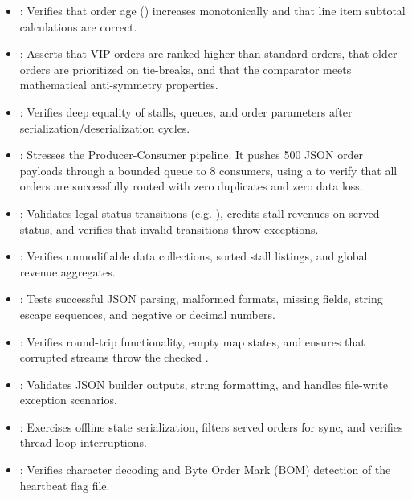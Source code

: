 \begin{itemize}
    \item {}: Verifies that order age () increases monotonically and that line item subtotal calculations are correct.
    \item {}: Asserts that VIP orders are ranked higher than standard orders, that older orders are prioritized on tie-breaks, and that the comparator meets mathematical anti-symmetry properties.
    \item {}: Verifies deep equality of stalls, queues, and order parameters after serialization/deserialization cycles.
    \item {}: Stresses the Producer-Consumer pipeline. It pushes 500 JSON order payloads through a bounded queue to 8 consumers, using a  to verify that all orders are successfully routed with zero duplicates and zero data loss.
    \item {}: Validates legal status transitions (e.g. ), credits stall revenues on served status, and verifies that invalid transitions throw exceptions.
    \item {}: Verifies unmodifiable data collections, sorted stall listings, and global revenue aggregates.
    \item {}: Tests successful JSON parsing, malformed formats, missing fields, string escape sequences, and negative or decimal numbers.
    \item {}: Verifies round-trip functionality, empty map states, and ensures that corrupted streams throw the checked .
    \item {}: Validates JSON builder outputs, string formatting, and handles file-write exception scenarios.
    \item {}: Exercises offline state serialization, filters served orders for sync, and verifies thread loop interruptions.
    \item {}: Verifies character decoding and Byte Order Mark (BOM) detection of the heartbeat flag file.
\end{itemize}

